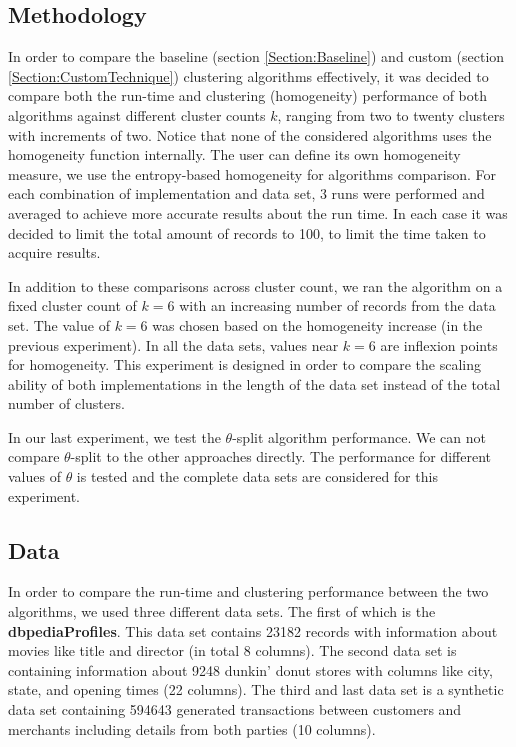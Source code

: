 \subsection{Methodology}
\label{Experiment}
In order to compare the baseline (section \ref{Section:Baseline}) and custom (section \ref{Section:CustomTechnique}) clustering algorithms effectively, it was decided to compare both the run-time and clustering (homogeneity) performance of both algorithms against different cluster counts $k$, ranging from two to twenty clusters with increments of two. Notice that none of the considered algorithms uses the homogeneity function internally. The user can define its own homogeneity measure, we use the entropy-based homogeneity for algorithms comparison. For each combination of implementation and data set, 3 runs were performed and averaged to achieve more accurate results about the run time. In each case it was decided to limit the total amount of records to 100, to limit the time taken to acquire results.

In addition to these comparisons across cluster count, we ran the algorithm on a fixed cluster count of $k = 6$ with an increasing number of records from the data set. The value of $k = 6$ was chosen based on the homogeneity increase (in the previous experiment). In all the data sets, values near $k=6$ are inflexion points for homogeneity. This experiment is designed in order to compare the scaling ability of both implementations in the length of the data set instead of the total number of clusters.

In our last experiment, we test the $\theta$-split algorithm performance. We can not compare $\theta$-split to the other approaches directly. The performance for different values of $\theta$ is tested and the complete data sets are considered for this experiment. 


\subsection{Data}
In order to compare the run-time and clustering performance between the two algorithms, we used three different data sets. The first of which is the \textbf{dbpediaProfiles}. This data set contains 23182 records with information about movies like title and director (in total 8 columns). The second data set is containing information about 9248 dunkin' donut stores with columns like city, state, and opening times \cite{Dunkin} (22 columns). The third and last data set is a synthetic data set containing 594643 generated transactions between customers and merchants including details from both parties \cite{SyntheticData} (10 columns). 

